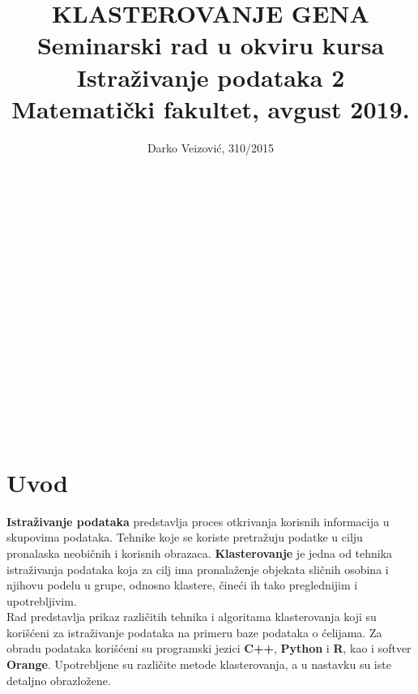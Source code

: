 \documentclass[a4paper]{article}
\begin{document}
\title{\textbf{KLASTEROVANJE GENA}\\ \small{Seminarski rad u okviru kursa\\Istraživanje podataka 2\\ Matematički fakultet, avgust 2019.}}


\author{Darko Veizović, 310/2015 \\ \\ \\ \\ \\ \\ }
\date{}
\maketitle

\\
\\
\\
\\
\\

\tableofcontents
 



\\
\\
\\
\\
\newpage






\section{Uvod}
\label{sec:uvod}
\textbf{Istraživanje podataka} predstavlja proces otkrivanja korisnih informacija u skupovima podataka. Tehnike koje se koriste pretražuju podatke u cilju pronalaska neobičnih i korisnih obrazaca. 
\textbf{Klasterovanje} je jedna od tehnika istraživanja podataka koja za cilj ima pronalaženje objekata sličnih osobina i njihovu podelu u grupe, odnosno klastere, čineći ih tako preglednijim i upotrebljivim.
\\
Rad predstavlja prikaz različitih tehnika i algoritama klasterovanja koji su korišćeni za istraživanje podataka na primeru baze podataka o ćelijama. Za obradu podataka korišćeni su programski jezici \textbf{C++}, \textbf{Python} i \textbf{R}, kao i softver \textbf{Orange}.
Upotrebljene su različite metode klasterovanja, a u nastavku su iste detaljno obrazložene.
 
\\
\end{document}
